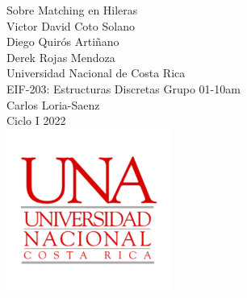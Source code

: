 \documentclass[stu, 11pt, letterpaper, donotrepeattitle, floatsintext, natbib, helv]{apa7}
\providecommand{\keywords}[1]
{
  \small	
  \textbf{\textit{Palabras Clave---}} #1
}
\begin{document}


\begin{titlepage}
    \centering
    \vfill
    \LARGE Sobre Matching en Hileras\\
    \vskip2cm
    \large Victor David Coto Solano \\
    \large Diego Quirós Artiñano \\
    \large Derek Rojas Mendoza \\
    \vskip2cm
    Universidad Nacional de Costa Rica \\
    EIF-203: Estructuras Discretas Grupo 01-10am \\ 
    Carlos Loria-Saenz \\
    Ciclo I 2022 \\
    \vfill
    \includegraphics[width = 0.4\textwidth]{./UNAImage/UNA.png} \\
    \vfill
    \vfill
\end{titlepage}





\newpage
    \addto{}
\tableofcontents
\setcounter{tocdepth}{2}
\newpage
\renewcommand{\listfigurename}{\largeÍndice de fíguras}
\listoffigures
\newpage
\renewcommand{\listtablename}{\largeÍndice de tablas}
\listoftables
\newpage
\end{document}
